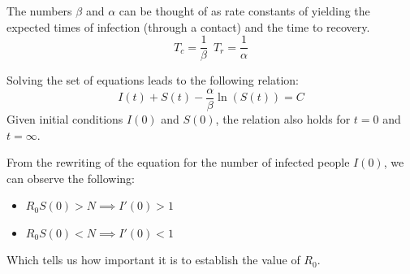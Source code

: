The numbers $\beta$ and $\alpha$ can be thought of as rate constants of
yielding the expected times of infection (through a contact) and the time 
to recovery.
\begin{equation*}
    T_c = \frac{1}{\beta} \, \, \, T_r = \frac{1}{\alpha}
\end{equation*}

Solving the set of equations leads to the following relation:
\begin{equation}
    I(t) + S(t) - \frac{\alpha}{\beta} \ln (S(t)) = C
\end{equation}
Given initial conditions $I(0)$ and $S(0)$, the relation also holds 
for $t = 0$ and $t = \infty$.

From the rewriting of the equation for the number of infected people $
I(0)$, we can observe the following:
\begin{itemize}
    \item $R_0 S(0) > N \implies I'(0) > 1$
    \item $R_0 S(0) < N \implies I'(0) < 1$
\end{itemize}
Which tells us how important it is to establish the value of $R_0$.
